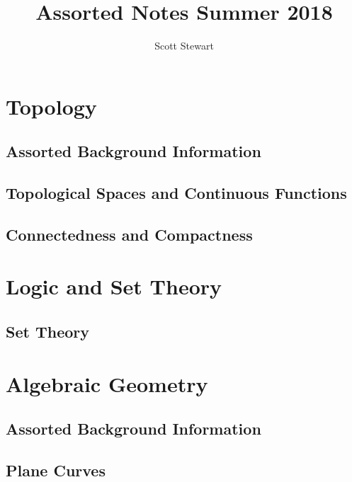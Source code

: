 \documentclass[10pt]{report}
\begin{document}
\title{Assorted Notes Summer 2018}
\author{Scott Stewart}
\maketitle
\tableofcontents

\part{Topology}
\chapter{Assorted Background Information}

\chapter{Topological Spaces and Continuous Functions}

\chapter{Connectedness and Compactness}


\part{Logic and Set Theory}
\chapter{Set Theory}


\part{Algebraic Geometry}
\chapter{Assorted Background Information}

\chapter{Plane Curves}

\end{document}
